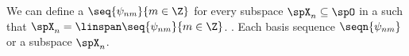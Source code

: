 %
%
We can define a  $\seq{\psi_{nm}}{m\in\Z}$
for every subspace $\spX_n\subseteq\spO$ 
in a  such that 
$\spX_n = \linspan\seq{\psi_{nm}}{m\in\Z}$.
.
Each basis sequence $\seqn{\psi_{nm}}$  or  a subspace $\spX_n$.


